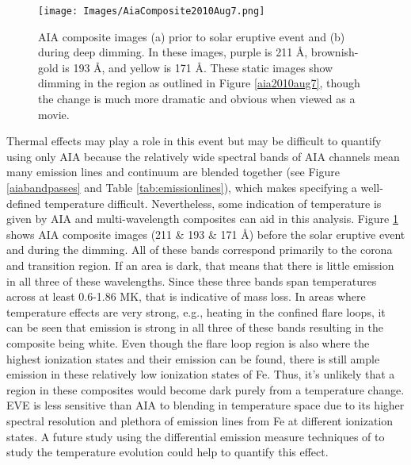 \begin{figure}[!h]
    \begin{center}
	    \texttt{[image: Images/AiaComposite2010Aug7.png]}
    \end{center}
    \caption[AIA before/after images of 2010 August 7 event]{
	    AIA composite images (a) prior to solar eruptive event and (b) during deep dimming. In these images, purple is 
	    211 \AA, brownish-gold is 193 \AA, and yellow is 171 \AA. These static images show dimming in the region as outlined 
	    in Figure \ref{aia2010aug7}, though the change is much more dramatic and obvious when viewed as a movie. 
	}
    \label{aiacomposite2010aug7}
\end{figure}

Thermal effects may play a role in this event but may be difficult to quantify using only AIA because the relatively wide spectral bands of AIA channels mean many emission lines and continuum are blended together (see Figure \ref{aiabandpasses} and Table \ref{tab:emissionlines}), which makes specifying a well-defined temperature difficult. Nevertheless, some indication of temperature is given by AIA and multi-wavelength composites can aid in this analysis. Figure \ref{aiacomposite2010aug7} shows AIA composite images (211 \& 193 \& 171 \AA) before the solar eruptive event and during the dimming. All of these bands correspond primarily to the corona and transition region. If an area is dark, that means that there is little emission in all three of these wavelengths. Since these three bands span temperatures across at least 0.6-1.86 MK, that is indicative of mass loss. In areas where temperature effects are very strong, e.g., heating in the confined flare loops, it can be seen that emission is strong in all three of these bands resulting in the composite being white. Even though the flare loop region is also where the highest ionization states and their emission can be found, there is still ample emission in these relatively low ionization states of Fe. Thus, it's unlikely that a region in these composites would become dark purely from a temperature change. EVE is less sensitive than AIA to blending in temperature space due to its higher spectral resolution and plethora of emission lines from Fe at different ionization states. A future study using the differential emission measure techniques of \citet{Caspi2014} to study the temperature evolution could help to quantify this effect.

